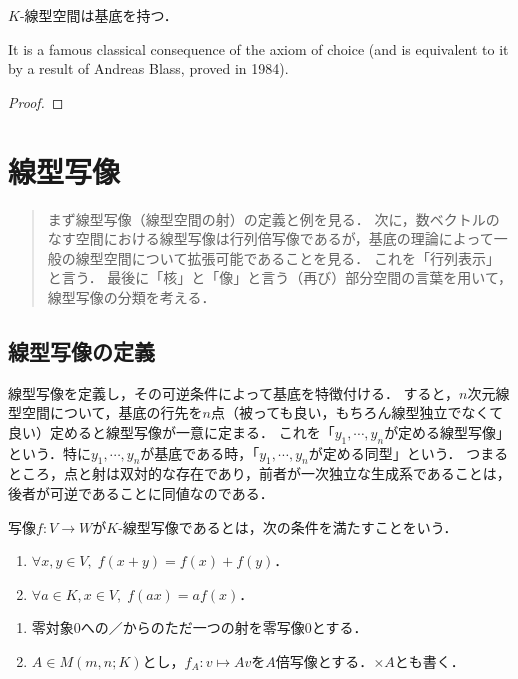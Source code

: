 \documentclass[uplatex, 12pt, dvipdfmx]{jsreport}
\begin{document}
\begin{theorem}\label{thm-basis}
    $K$-線型空間は基底を持つ．
\end{theorem}
\begin{remark}[選択公理と同値]
    It is a famous classical consequence of the axiom of choice (and is equivalent to it by a result of Andreas Blass, proved in 1984).
\end{remark}
\begin{proof}
    
\end{proof}

\chapter{線型写像}

\begin{quotation}
    まず線型写像（線型空間の射）の定義と例を見る．
    次に，数ベクトルのなす空間における線型写像は行列倍写像であるが，基底の理論によって一般の線型空間について拡張可能であることを見る．
    これを「行列表示」と言う．
    最後に「核」と「像」と言う（再び）部分空間の言葉を用いて，線型写像の分類を考える．
\end{quotation}

\section{線型写像の定義}

\begin{screen}
    線型写像を定義し，その可逆条件によって基底を特徴付ける．
    すると，$n$次元線型空間について，基底の行先を$n$点（被っても良い，もちろん線型独立でなくて良い）定めると線型写像が一意に定まる．
    これを「$y_1,\cdots,y_n$が定める線型写像」という．特に$y_1,\cdots,y_n$が基底である時，「$y_1,\cdots,y_n$が定める同型」という．
    つまるところ，点と射は双対的な存在であり，前者が一次独立な生成系であることは，後者が可逆であることに同値なのである．
\end{screen}

\begin{definition}
    写像$f:V\to W$が$K$-線型写像であるとは，次の条件を満たすことをいう．
    \begin{enumerate}
        \item $\forall x,y\in V,\; f(x+y)=f(x)+f(y)$．
        \item $\forall a\in K,x\in V,\; f(ax)=af(x)$．
    \end{enumerate}
\end{definition}
\begin{example}[特別な線型写像]\mbox{}
    \begin{enumerate}
        \item 零対象$0$への／からのただ一つの射を零写像$0$とする．
        \item $A\in M(m,n;K)$とし，$f_A:v\mapsto Av$を$A$倍写像とする．$\times A$とも書く．
    \end{enumerate}
\end{example}
\end{document}
